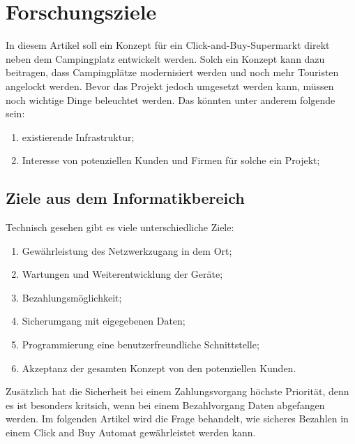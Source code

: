 \section{Forschungsziele}


In diesem Artikel soll ein Konzept für ein Click-and-Buy-Supermarkt direkt neben dem Campingplatz 
entwickelt werden. Solch ein Konzept kann dazu beitragen, dass Campingplätze modernisiert werden 
und noch mehr Touristen angelockt werden. Bevor das Projekt jedoch umgesetzt werden kann, müssen noch wichtige Dinge beleuchtet werden.
Das könnten unter anderem folgende sein:

\begin{enumerate}
    \item existierende Infrastruktur;
    \item Interesse von potenziellen Kunden und Firmen für solche ein Projekt;
\end{enumerate}


\subsection{Ziele aus dem Informatikbereich}

Technisch gesehen gibt es viele unterschiedliche Ziele:

\begin{enumerate}
    \item Gewährleistung des Netzwerkzugang in dem Ort;
    \item Wartungen und Weiterentwicklung der Geräte;
    \item Bezahlungsmöglichkeit;
    \item Sicherumgang mit eigegebenen Daten;
    \item Programmierung eine benutzerfreundliche Schnittstelle;
    \item Akzeptanz der gesamten Konzept von den potenziellen Kunden.
\end{enumerate}

Zusätzlich hat die Sicherheit bei einem Zahlungsvorgang höchste Priorität, denn es ist besonders kritsich, 
wenn bei einem Bezahlvorgang Daten abgefangen werden. 
Im folgenden Artikel wird die Frage behandelt, wie sicheres Bezahlen in einem Click and Buy Automat gewährleistet werden kann.

%
%
%
%

